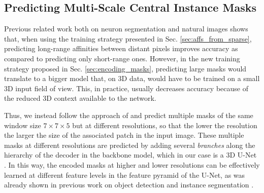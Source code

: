 \subsection{Predicting Multi-Scale Central Instance Masks}\label{sec:multiscale_patches}
Previous related work both on neuron segmentation \cite{lee2017superhuman} and natural images \cite{liu2018affinity,Gao_2019_ICCV} shows that, when using the training strategy presented in Sec. \ref{sec:affs_from_sparse}, predicting long-range affinities between distant pixels improves accuracy as compared to predicting only short-range ones. However, in the new training strategy proposed in Sec. \ref{sec:encoding_masks}, predicting large \maskname masks would translate to a bigger model that, on 3D data, would have to be trained on a small 3D input field of view.
This, in practice, usually decreases accuracy because of the reduced 3D context available to the network.

Thus, we instead follow the approach of \cite{Gao_2019_ICCV} and predict multiple \maskname masks of the same window size $7 \times 7 \times 5$ but at different resolutions, so that the lower the resolution the larger the size of the associated patch in the input image. 
These multiple masks at different resolutions are predicted by adding several \emph{\encBr branches} along the hierarchy of the decoder in the backbone model, which in our case is a 3D U-Net \cite{ronneberger2015u,cciccek20163d}. 
In this way, the encoded \maskname masks at higher and lower resolutions can be effectively learned at different feature levels in the feature pyramid of the U-Net, as was already shown in previous work on object detection and instance segmentation \cite{Gao_2019_ICCV,lin2017feature}.



